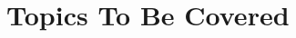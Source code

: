 \documentclass[12pt]{article}
\begin{document}
\maketitle
\section{Topics To Be Covered}
\end{document}
